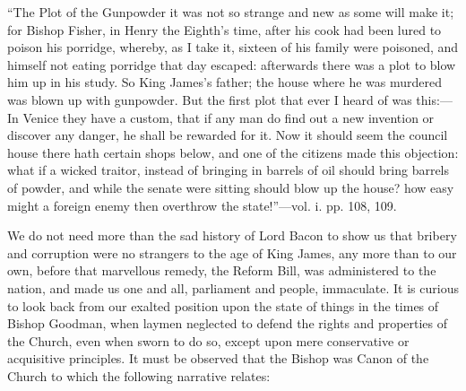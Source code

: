 ``The Plot of the Gunpowder it was
not so strange and new as some will make it; for Bishop Fisher, in Henry
the Eighth's time, after his cook had been lured to poison his porridge,
whereby, as I take it, sixteen of his family were poisoned, and himself
not eating porridge that day escaped: afterwards there was a plot to
blow him up in his study. So King James's father; the house where he was
murdered was blown up with gunpowder. But the first plot that ever I
heard of was this:—In Venice they have a custom, that if any man do
find out a new invention or discover any danger, he shall be rewarded
for it. Now it should seem the council house there hath certain shops
below, and one of the citizens made this objection: what if a wicked
traitor, instead of bringing in barrels of oil should bring barrels of
powder, and while the senate were sitting should blow up the house? how
easy might a foreign enemy then overthrow the state!''—vol. i. pp. 108,
109.

We do not need more than the sad history of Lord
Bacon to show us that bribery and corruption were no strangers to the
age of King James, any more than to our own, before that marvellous
remedy, the Reform Bill, was administered to the nation, and made us one
and all, parliament and people, immaculate. It is curious to look back
from our exalted position upon the state of things in the times of
Bishop Goodman, when laymen neglected to defend the rights and
properties of the Church, even when sworn to do so, except upon mere
conservative or acquisitive principles. It must be observed that the
Bishop was Canon of the Church to which the following narrative relates:

